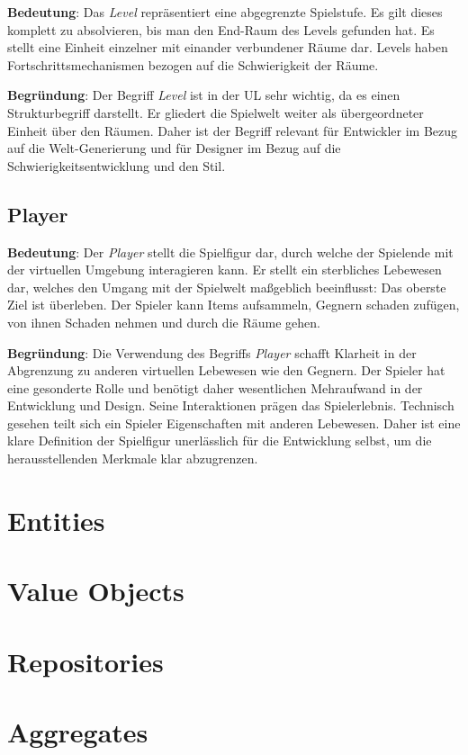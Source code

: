 \textbf{Bedeutung}: Das \textit{Level} repräsentiert eine abgegrenzte
Spielstufe. Es gilt dieses komplett zu absolvieren, bis man den
End-Raum des Levels gefunden hat. Es stellt eine Einheit einzelner mit
einander verbundener Räume dar. Levels haben Fortschrittsmechanismen
bezogen auf die Schwierigkeit der Räume.

\textbf{Begründung}: Der Begriff \textit{Level} ist in der UL sehr
wichtig, da es einen Strukturbegriff darstellt. Er gliedert die
Spielwelt weiter als übergeordneter Einheit über den Räumen. Daher
ist der Begriff relevant für Entwickler im Bezug auf die Welt-Generierung
und für Designer im Bezug auf die Schwierigkeitsentwicklung und den
Stil.



\subsection*{Player}

\textbf{Bedeutung}: Der \textit{Player} stellt die Spielfigur dar,
durch welche der Spielende mit der virtuellen Umgebung interagieren
kann. Er stellt ein sterbliches Lebewesen dar, welches den Umgang mit
der Spielwelt maßgeblich beeinflusst: Das oberste Ziel ist überleben.
Der Spieler kann Items aufsammeln, Gegnern schaden zufügen, von ihnen
Schaden nehmen und durch die Räume gehen.

\textbf{Begründung}: Die Verwendung des Begriffs \textit{Player}
schafft Klarheit in der Abgrenzung zu anderen virtuellen Lebewesen
wie den Gegnern. Der Spieler hat eine gesonderte Rolle und benötigt
daher wesentlichen Mehraufwand in der Entwicklung und Design. Seine
Interaktionen prägen das Spielerlebnis. Technisch gesehen teilt sich
ein Spieler Eigenschaften mit anderen Lebewesen. Daher ist eine klare
Definition der Spielfigur unerlässlich für die Entwicklung selbst, um
die herausstellenden Merkmale klar abzugrenzen.

\section{Entities}

\section{Value Objects}

\section{Repositories}

\section{Aggregates}